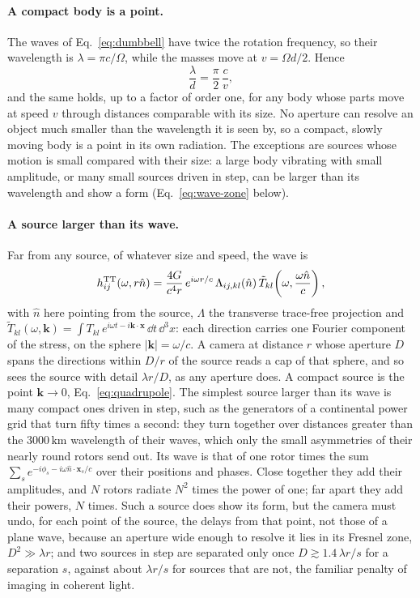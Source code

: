 \paragraph{A compact body is a point.} The waves of Eq.~\eqref{eq:dumbbell} have
twice the rotation frequency, so their wavelength is $\lambda = \pi c/\Omega$,
while the masses move at $v = \Omega d/2$. Hence
\begin{equation}\label{eq:unresolved}
\frac{\lambda}{d} = \frac{\pi}{2}\,\frac{c}{v} ,
\end{equation}
and the same holds, up to a factor of order one, for any body whose parts move
at speed $v$ through distances comparable with its size. No aperture can
resolve an object much smaller than the wavelength it is seen by, so a compact,
slowly moving body is a point in its own radiation. The exceptions are sources whose motion is
small compared with their size: a large body vibrating with small amplitude,
or many small sources driven in step, can be larger than its wavelength and
show a form (Eq.~\eqref{eq:wave-zone} below).

\paragraph{A source larger than its wave.} Far from any source, of whatever
size and speed, the wave is
\begin{equation}\label{eq:wave-zone}
h_{ij}^{\mathrm{TT}}(\omega, r\hat n) = \frac{4G}{c^4 r}\,e^{i\omega r/c}\,
\Lambda_{ij,kl}(\hat n)\,\tilde T_{kl}\!\left(\omega, \frac{\omega\hat n}{c}\right),
\end{equation}
with $\hat n$ here pointing from the source, $\Lambda$ the transverse
trace-free projection and $\tilde T_{kl}(\omega,
\mathbf k) = \int T_{kl}\,e^{i\omega t - i\mathbf k\cdot\mathbf x}\,\dd t\,
\dd^3x$: each direction carries one Fourier component of the stress, on the
sphere $|\mathbf k| = \omega/c$. A camera at distance $r$ whose aperture $D$
spans the directions within $D/r$ of the source reads a cap of that sphere,
and so sees the source with detail $\lambda r/D$, as any aperture does. A
compact source is the point $\mathbf k \to 0$, Eq.~\eqref{eq:quadrupole}. The
simplest source larger than its wave is many compact ones driven in step,
such as the generators of a continental power grid that turn fifty times a
second: they turn together over distances greater than the
$3000\,\mathrm{km}$ wavelength of their waves, which only the small asymmetries
of their nearly round rotors send out. Its
wave is that of one rotor times the sum $\sum_s e^{-i\phi_s - i\omega\hat
n\cdot\mathbf x_s/c}$ over their positions and phases. Close together they
add their amplitudes, and $N$ rotors radiate $N^2$ times the power of one; far
apart they add their powers, $N$ times. Such a source does show its form, but
the camera must undo, for each point of the source, the delays from that
point, not those of a plane wave, because an aperture wide enough to resolve
it lies in its Fresnel zone, $D^2 \gg \lambda r$; and two sources in step are
separated only once
$D \gtrsim 1.4\,\lambda r/s$ for a separation $s$, against
about $\lambda r/s$ for sources that are not, the familiar penalty of imaging
in coherent light.


